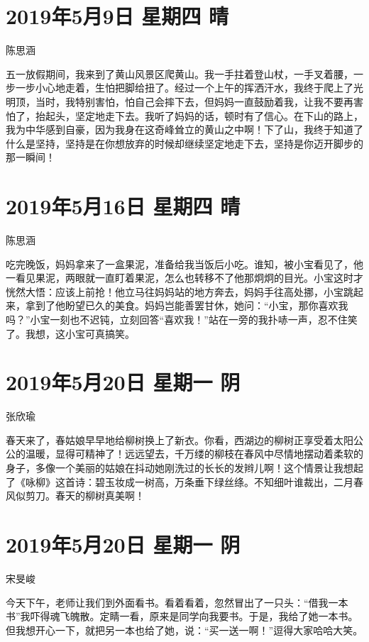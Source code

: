 \section{2019年5月9日 星期四 晴}

陈思涵

五一放假期间，我来到了黄山风景区爬黄山。我一手拄着登山杖，一手叉着腰，一步一步小心地走着，生怕把脚给扭了。经过一个上午的挥洒汗水，我终于爬上了光明顶，当时，我特别害怕，怕自己会摔下去，但妈妈一直鼓励着我，让我不要再害怕了，抬起头，坚定地走下去。我听了妈妈的话，顿时有了信心。在下山的路上，我为中华感到自豪，因为我身在这奇峰耸立的黄山之中啊！下了山，我终于知道了什么是坚持，坚持是在你想放弃的时候却继续坚定地走下去，坚持是你迈开脚步的那一瞬间！

\section{2019年5月16日 星期四 晴}

陈思涵

吃完晚饭，妈妈拿来了一盒果泥，准备给我当饭后小吃。谁知，被小宝看见了，他一看见果泥，两眼就一直盯着果泥，怎么也转移不了他那炯炯的目光。小宝这时才恍然大悟：应该上前抢！他立马往妈妈站的地方奔去，妈妈手往高处挪，小宝跳起来，拿到了他盼望已久的美食。妈妈岂能善罢甘休，她问：“小宝，那你喜欢我吗？”小宝一刻也不迟钝，立刻回答“喜欢我！”站在一旁的我扑哧一声，忍不住笑了。我想，这小宝可真搞笑。

\section{2019年5月20日 星期一 阴}

张欣瑜

春天来了，春姑娘早早地给柳树换上了新衣。你看，西湖边的柳树正享受着太阳公公的温暖，显得可精神了！远远望去，千万缕的柳枝在春风中尽情地摆动着柔软的身子，多像一个美丽的姑娘在抖动她刚洗过的长长的发辫儿啊！这个情景让我想起了《咏柳》这首诗：碧玉妆成一树高，万条垂下绿丝绦。不知细叶谁裁出，二月春风似剪刀。春天的柳树真美啊！

\section{2019年5月20日 星期一 阴}

宋旻峻

今天下午，老师让我们到外面看书。看着看着，忽然冒出了一只头：“借我一本书”我吓得魂飞魄散。定睛一看，原来是同学向我要书。于是，我给了她一本书。但我想开心一下，就把另一本也给了她，说：“买一送一啊！”逗得大家哈哈大笑。

